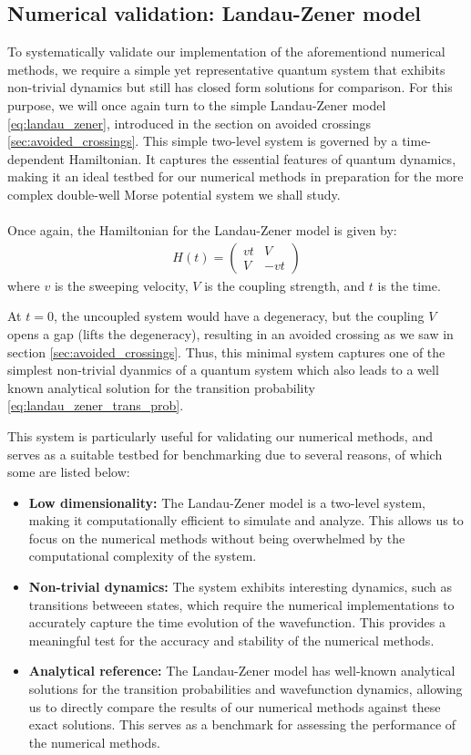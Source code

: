 \documentclass{subfiles}
\begin{document}
\subsection{Numerical validation: Landau-Zener model}
To systematically validate our implementation of the aforementiond numerical methods, we require a simple yet representative quantum system that exhibits non-trivial dynamics but still has closed form solutions for comparison. For this purpose, we will once again turn to the simple Landau-Zener model \eqref{eq:landau_zener}, introduced in the section on avoided crossings \ref{sec:avoided_crossings}. This simple two-level system is governed by a time-dependent Hamiltonian. It captures the essential features of quantum dynamics, making it an ideal testbed for our numerical methods in preparation for the more complex double-well Morse potential system we shall study. \\\\

Once again, the Hamiltonian for the Landau-Zener model is given by:
\begin{align*}
    H(t) = \begin{pmatrix}
        vt & V \\
        V & -vt
\end{pmatrix}
\end{align*}
where $v$ is the sweeping velocity, $V$ is the coupling strength, and $t$ is the time. 

At $t=0$, the uncoupled system would have a degeneracy, but the coupling $V$ opens a gap (lifts the degeneracy), resulting in an avoided crossing as we saw in section \ref{sec:avoided_crossings}. Thus, this minimal system captures one of the simplest non-trivial dyanmics of a quantum system which also leads to a well known analytical solution for the transition probability \eqref{eq:landau_zener_trans_prob}. 

This system is particularly useful for validating our numerical methods, and serves as a suitable testbed for benchmarking due to several reasons, of which some are listed below:
\begin{itemize}
    \item \textbf{Low dimensionality:} The Landau-Zener model is a two-level system, making it computationally efficient to simulate and analyze. This allows us to focus on the numerical methods without being overwhelmed by the computational complexity of the system.
    \item \textbf{Non-trivial dynamics:} The system exhibits interesting dynamics, such as transitions betweeen states, which require the numerical implementations to accurately capture the time evolution of the wavefunction. This provides a meaningful test for the accuracy and stability of the numerical methods.
    \item \textbf{Analytical reference:} The Landau-Zener model has well-known analytical solutions for the transition probabilities and wavefunction dynamics, allowing us to directly compare the results of our numerical methods against these exact solutions. This serves as a benchmark for assessing the performance of the numerical methods.
\end{itemize}
\end{document}
